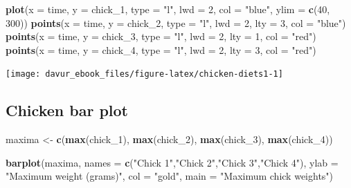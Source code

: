 \documentclass[]{book}
\newenvironment{Shaded}{\begin{snugshade}}{\end{snugshade}}
\newcommand{\DataTypeTok}[1]{\textcolor[rgb]{0.13,0.29,0.53}{#1}}
\newcommand{\DecValTok}[1]{\textcolor[rgb]{0.00,0.00,0.81}{#1}}
\newcommand{\KeywordTok}[1]{\textcolor[rgb]{0.13,0.29,0.53}{\textbf{#1}}}
\newcommand{\NormalTok}[1]{#1}
\newcommand{\StringTok}[1]{\textcolor[rgb]{0.31,0.60,0.02}{#1}}
\begin{document}
\begin{Shaded}
\begin{Highlighting}[]
\KeywordTok{plot}\NormalTok{(}\DataTypeTok{x =}\NormalTok{ time, }\DataTypeTok{y =}\NormalTok{ chick_}\DecValTok{1}\NormalTok{,}
         \DataTypeTok{type =} \StringTok{"l"}\NormalTok{,}
         \DataTypeTok{lwd =} \DecValTok{2}\NormalTok{,}
         \DataTypeTok{col =} \StringTok{"blue"}\NormalTok{,}
         \DataTypeTok{ylim =} \KeywordTok{c}\NormalTok{(}\DecValTok{40}\NormalTok{, }\DecValTok{300}\NormalTok{))}
\KeywordTok{points}\NormalTok{(}\DataTypeTok{x =}\NormalTok{ time, }\DataTypeTok{y =}\NormalTok{ chick_}\DecValTok{2}\NormalTok{,}
         \DataTypeTok{type =} \StringTok{"l"}\NormalTok{,}
         \DataTypeTok{lwd =} \DecValTok{2}\NormalTok{,}
         \DataTypeTok{lty =} \DecValTok{3}\NormalTok{,}
         \DataTypeTok{col =} \StringTok{"blue"}\NormalTok{)}
\KeywordTok{points}\NormalTok{(}\DataTypeTok{x =}\NormalTok{ time, }\DataTypeTok{y =}\NormalTok{ chick_}\DecValTok{3}\NormalTok{,}
         \DataTypeTok{type =} \StringTok{"l"}\NormalTok{,}
         \DataTypeTok{lwd =} \DecValTok{2}\NormalTok{,}
         \DataTypeTok{lty =} \DecValTok{1}\NormalTok{,}
         \DataTypeTok{col =} \StringTok{"red"}\NormalTok{)}
\KeywordTok{points}\NormalTok{(}\DataTypeTok{x =}\NormalTok{ time, }\DataTypeTok{y =}\NormalTok{ chick_}\DecValTok{4}\NormalTok{,}
         \DataTypeTok{type =} \StringTok{"l"}\NormalTok{,}
         \DataTypeTok{lwd =} \DecValTok{2}\NormalTok{,}
         \DataTypeTok{lty =} \DecValTok{3}\NormalTok{,}
         \DataTypeTok{col =} \StringTok{"red"}\NormalTok{)}
\end{Highlighting}
\end{Shaded}

\begin{center}\texttt{[image: davur\_ebook\_files/figure-latex/chicken-diets1-1]} \end{center}

\hypertarget{chicken-bar-plot-1}{%
\subsection{Chicken bar plot}\label{chicken-bar-plot-1}}

\begin{Shaded}
\begin{Highlighting}[]
\NormalTok{maxima <-}\StringTok{ }\KeywordTok{c}\NormalTok{(}\KeywordTok{max}\NormalTok{(chick_}\DecValTok{1}\NormalTok{), }\KeywordTok{max}\NormalTok{(chick_}\DecValTok{2}\NormalTok{), }\KeywordTok{max}\NormalTok{(chick_}\DecValTok{3}\NormalTok{), }\KeywordTok{max}\NormalTok{(chick_}\DecValTok{4}\NormalTok{))}

\KeywordTok{barplot}\NormalTok{(maxima,}
    \DataTypeTok{names =} \KeywordTok{c}\NormalTok{(}\StringTok{"Chick 1"}\NormalTok{,}\StringTok{"Chick 2"}\NormalTok{,}\StringTok{"Chick 3"}\NormalTok{,}\StringTok{"Chick 4"}\NormalTok{),}
    \DataTypeTok{ylab =} \StringTok{"Maximum weight (grams)"}\NormalTok{,}
    \DataTypeTok{col =} \StringTok{"gold"}\NormalTok{,}
    \DataTypeTok{main =} \StringTok{"Maximum chick weights"}\NormalTok{)}
\end{Highlighting}
\end{Shaded}
\end{document}
